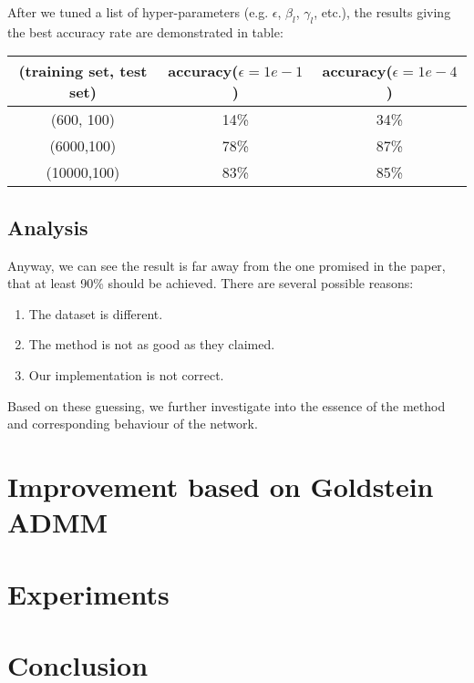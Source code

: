 \documentclass[letterpaper, 10 pt, conference]{ieeeconf}  %
\begin{document}
After we tuned a list of hyper-parameters (e.g. $\epsilon$, $\beta_l$, $\gamma_l$, etc.), the results giving the best accuracy rate are demonstrated in table:
\begin{table}
\begin{center}
\begin{tabular}{c c c}
	\hline
		(training set, test set) & accuracy($\epsilon=1e-1$) & accuracy($\epsilon=1e-4$)\\
		\hline
		(600, 100) & 14\% & 34\% \\
		(6000,100) & 78\% & 87\% \\
		(10000,100) & 83\% & 85\% \\
	\hline
\end{tabular}
\end{center}
\end{table}

\subsection{Analysis}
Anyway, we can see the result is far away from the one promised in the paper, that at least 90\% should be achieved. There are several possible reasons: 
\begin{enumerate}
	\item The dataset is different.
	\item The method is not as good as they claimed.
	\item Our implementation is not correct.
\end{enumerate}

Based on these guessing, we further investigate into the essence of the method and corresponding behaviour of the network. 
\section{Improvement based on Goldstein ADMM} \label{improvement}

\section{Experiments} \label{experiment}
\section{Conclusion} \label{conclusion}

\end{document}
